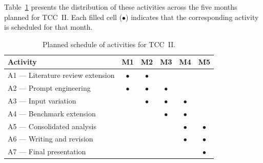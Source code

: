 Table~\ref{tab:schedule} presents the distribution of these activities across
the five months planned for TCC~II. Each filled cell ($\bullet$) indicates that
the corresponding activity is scheduled for that month.

\begin{table}[htbp]
\centering
\caption{Planned schedule of activities for TCC~II.}
\label{tab:schedule}
\begin{tabular}{lccccc}
\toprule
\textbf{Activity} & \textbf{M1} & \textbf{M2} & \textbf{M3} & \textbf{M4} & \textbf{M5} \\
\midrule
A1 --- Literature review extension   & $\bullet$ & $\bullet$ &           &           &           \\
A2 --- Prompt engineering            & $\bullet$ & $\bullet$ & $\bullet$ &           &           \\
A3 --- Input variation               &           & $\bullet$ & $\bullet$ & $\bullet$ &           \\
A4 --- Benchmark extension           &           &           & $\bullet$ & $\bullet$ &           \\
A5 --- Consolidated analysis         &           &           &           & $\bullet$ & $\bullet$ \\
A6 --- Writing and revision          &           &           &           & $\bullet$ & $\bullet$ \\
A7 --- Final presentation            &           &           &           &           & $\bullet$ \\
\bottomrule
\end{tabular}
\end{table}